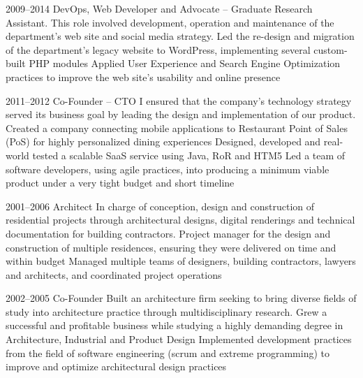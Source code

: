 \documentclass[full]{rvca}
\begin{document}
{2009--2014}
{DevOps, Web Developer and Advocate -- Graduate Research Assistant.} %
{This role involved development, operation and maintenance of the department's web site and social media strategy.}
{Led the re-design and migration of the department's legacy website to WordPress, implementing several custom-built PHP modules}
{Applied User Experience and Search Engine Optimization practices to improve the web site's usability and online presence}
{}
{}

{2011--2012}
{Co-Founder -- CTO} %
{I ensured that the company's technology strategy served its business goal by leading the design and implementation of our product.} %
{Created a company connecting mobile applications to Restaurant Point of Sales (PoS) for highly personalized dining experiences}
{Designed, developed and real-world tested a scalable SaaS service using Java, RoR and HTM5}
{Led a team of software developers, using agile practices, into producing a minimum viable product under a very tight budget and short timeline}
{}
{}


{2001--2006}
{Architect} %
{In charge of conception, design and construction of residential projects through architectural designs, digital renderings and technical documentation for building contractors.} %
{Project manager for the design and construction of multiple residences, ensuring they were delivered on time and within budget}
{Managed multiple teams of designers, building contractors, lawyers and architects, and coordinated project operations}
{}
{}
{}

{2002--2005}
{Co-Founder} %
{Built an architecture firm seeking to bring diverse fields of study into architecture practice through multidisciplinary research.} %
{Grew a successful and profitable business while studying a highly demanding degree in Architecture, Industrial and Product Design}
{Implemented development practices from the field of software engineering (scrum and extreme programming) to improve and optimize architectural design practices}
{}
{}
{}
\end{document}
